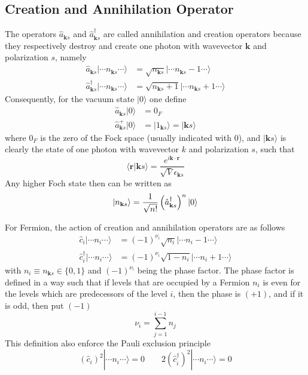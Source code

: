 \documentclass[../../../main.tex]{subfiles}
\begin{document}
\subsection{Creation and Annihilation Operator}
The operators $\hat{a}_{\mathbf{k }s}$ and $\hat{a}^\dagger_{\mathbf{k }s}$ are called annihilation and creation operators because they respectively destroy and create one photon with wavevector $\mathbf{k}$ and polarization $s$, namely
\begin{align*}
  \hat{a}_{\mathbf{k }s} | \cdots n_{\mathbf{k }s} \cdots \rangle         & = \sqrt{n_{\mathbf{k }s}} |  \cdots n_{\mathbf{k }s} - 1 \cdots \rangle    \\
  \hat{a}^\dagger_{\mathbf{k }s} | \cdots n_{\mathbf{k }s} \cdots \rangle & = \sqrt{n_{\mathbf{k }s} + 1} |\cdots  n_{\mathbf{k }s} + 1 \cdots \rangle
\end{align*}
Consequently, for the vacuum state $|0\rangle$ one define
\begin{align*}
  \hat{a}_{\mathbf{k }s} | 0 \rangle   & = 0_F                                                 \\
  \hat{a}^+_{\mathbf{k }s} | 0 \rangle & = | 1_{\mathbf{k }s} \rangle = | \mathbf{k} s \rangle
\end{align*}
where $0_F$ is the zero of the Fock space (usually indicated with $0$), and $| \mathbf{k} s \rangle$ is clearly the state of one photon with wavevector $k$ and polarization $s$, such that
\begin{equation*}
  \langle \mathbf{r} | \mathbf{k} s \rangle = \frac{e^{i \mathbf{k} \cdot \mathbf{r}}}{\sqrt{V} \epsilon_{\mathbf{k }s}}
\end{equation*}
Any higher Foch state then can be written as
\begin{equation*}
  \ket{n_{\mathbf{k }s}}=\frac{1}{\sqrt{n!}}\left( \hat{a}^\dagger_{\mathbf{k }s}   \right) ^{n }\ket{0}
\end{equation*}

For Fermion, the action of creation and annihilation operators are as follows
\begin{align*}
  \hat{c}_{i} | \cdots n_{i} \cdots \rangle         & = (-1)^{\nu_i}\sqrt{n_{i}} |  \cdots n_{i} - 1 \cdots \rangle    \\
  \hat{c}^\dagger_{i} | \cdots n_{i} \cdots \rangle & = (-1)^{\nu_i} \sqrt{ 1 - n_i} |\cdots  n_{i} + 1 \cdots \rangle
\end{align*}
with $n_i \equiv n_{\mathbf{k }s} \in \{0,1\}$ and $(-1)^{\nu_i}$ being the phase factor.
The phase factor is defined in a way such that if levels that are occupied by a Fermion $n_i$ is even for the levels which are predecessors of the level $i$, then the phase is $(+1)$, and if it is odd, then put $(-1)$
\begin{equation*}
  \nu_{i} =  \sum_{j=1}^{i -1} n_j
\end{equation*}
This definition also enforce the Pauli exclusion principle
\begin{equation*}
  (\hat{c}_{i})^2 | \cdots n_{i} \cdots \rangle= 0\qquad2  (\hat{c}^\dagger_{i})^2 | \cdots n_{i} \cdots \rangle = 0
\end{equation*}
\end{document}
